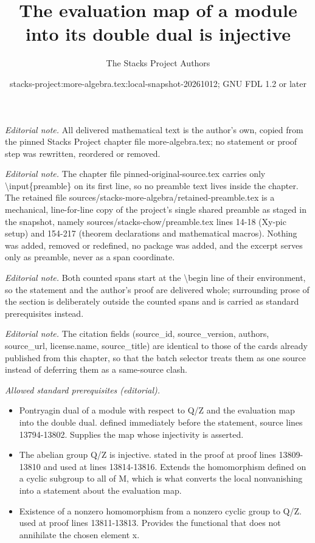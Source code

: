 \documentclass[10pt,a4paper]{amsart}
\title{The evaluation map of a module into its double dual is injective}
\author{The Stacks Project Authors}
\date{stacks-project:more-algebra.tex:local-snapshot-20261012; GNU FDL 1.2 or later}
\theoremstyle{plain}
\theoremstyle{definition}
\theoremstyle{remark}
\numberwithin{equation}{subsection}
\begin{document}
\maketitle
\setcounter{subsection}{1}
\noindent\textit{Editorial note.} All delivered mathematical text is the author's own, copied from the pinned Stacks Project chapter file more-algebra.tex; no statement or proof step was rewritten, reordered or removed.\par\medskip
\noindent\textit{Editorial note.} The chapter file pinned-original-source.tex carries only \textbackslash{}input\{preamble\} on its first line, so no preamble text lives inside the chapter. The retained file sources/stacks-more-algebra/retained-preamble.tex is a mechanical, line-for-line copy of the project's single shared preamble as staged in the snapshot, namely sources/stacks-chow/preamble.tex lines 14-18 (Xy-pic setup) and 154-217 (theorem declarations and mathematical macros). Nothing was added, removed or redefined, no package was added, and the excerpt serves only as preamble, never as a span coordinate.\par\medskip
\noindent\textit{Editorial note.} Both counted spans start at the \textbackslash{}begin line of their environment, so the statement and the author's proof are delivered whole; surrounding prose of the section is deliberately outside the counted spans and is carried as standard prerequisites instead.\par\medskip
\noindent\textit{Editorial note.} The citation fields (source\_id, source\_version, authors, source\_url, license.name, source\_title) are identical to those of the cards already published from this chapter, so that the batch selector treats them as one source instead of deferring them as a same-source clash.\par\medskip
\noindent\textit{Allowed standard prerequisites (editorial).}\begin{itemize}
\item Pontryagin dual of a module with respect to Q/Z and the evaluation map into the double dual. defined immediately before the statement, source lines 13794-13802. Supplies the map whose injectivity is asserted.
\item The abelian group Q/Z is injective. stated in the proof at proof lines 13809-13810 and used at lines 13814-13816. Extends the homomorphism defined on a cyclic subgroup to all of M, which is what converts the local nonvanishing into a statement about the evaluation map.
\item Existence of a nonzero homomorphism from a nonzero cyclic group to Q/Z. used at proof lines 13811-13813. Provides the functional that does not annihilate the chosen element x.
\end{itemize}\medskip
\end{document}
